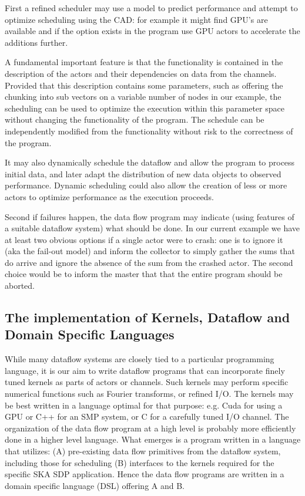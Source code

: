\documentclass[11pt,a4paper]{article}
\begin{document}
First a refined scheduler may use a model to predict performance and attempt to optimize scheduling using the CAD: for example it might find GPU’s are available and if the option exists in the program use GPU actors to accelerate the additions further.    

A fundamental important feature is that the functionality is contained in the description of the actors and their dependencies on data from the channels.  Provided that this description contains some parameters, such as offering the chunking into sub vectors on a variable number of nodes in our example, the scheduling can be used to optimize the execution within this parameter space without changing the functionality of the program.  The schedule can be independently modified from the functionality without risk to the correctness of the program.

It may also dynamically schedule the dataflow and allow the program to process initial data, and later adapt the distribution of new data objects to observed performance.  Dynamic scheduling could also allow the creation of less or more actors to optimize performance as the execution proceeds. 

Second if failures happen, the data flow program may indicate (using features of a suitable dataflow system) what should be done.   In our current example we have at least two obvious options if a single actor were to crash: one is to ignore it (aka the fail-out model) and inform the collector to simply gather the sums that do arrive and ignore the absence of the sum from the crashed actor.  The second choice would be to inform the master that that the entire program should be aborted.

\subsection{The implementation of Kernels, Dataflow and Domain Specific Languages}

While many dataflow systems are closely tied to a particular programming language, it is our aim to write dataflow programs that can incorporate finely tuned kernels as parts of actors or channels.  Such kernels may perform specific numerical functions such as Fourier transforms, or refined I/O. The kernels may be best written in a language optimal for that purpose: e.g. Cuda for using a GPU or C++ for an SMP system, or C for a carefully tuned I/O channel. 
The organization of the data flow program at a high level is probably more efficiently done in a higher level language.
What emerges is a program written in a language that utilizes:
(A) pre-existing data flow primitives from the dataflow system, including those for scheduling
(B) interfaces to the kernels required for the specific SKA SDP application.
Hence the data flow programs are written in a domain specific language (DSL) offering A and B. 
\end{document}
